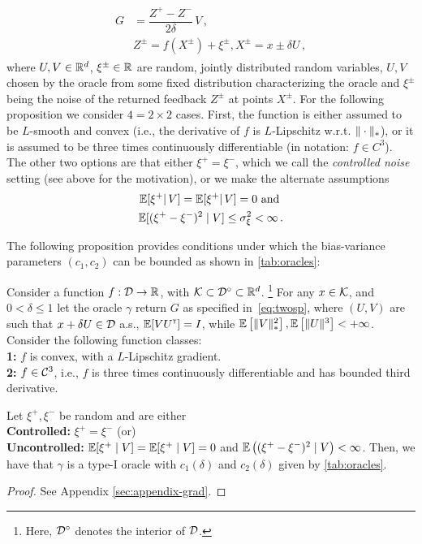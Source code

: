 \begin{align}
\begin{split}
G &=  \dfrac{Z^+ - Z^-}{2\delta}\, V \,, \\
&  Z^{\pm} = f(X^{\pm}) + \xi^{\pm}, X^{\pm} = x \pm \delta U\,,
 \end{split}
 \label{eq:twosp}
\end{align}
where $U,V\in \mathbb{R}^d$, $\xi^{\pm}\in \mathbb{R}$ are random, jointly distributed random variables, $U,V$ chosen by the oracle
from some fixed distribution characterizing the oracle and $\xi^{\pm}$ being the noise of the returned feedback $Z^{\pm}$ at points $X^{\pm}$.
For the following proposition we consider $4=2\times 2$ cases.
First, the function is either assumed to be $L$-smooth and convex (i.e., the derivative of $f$ is $L$-Lipschitz w.r.t. $\|\cdot\|_*$), or it is assumed to be three times continuously differentiable (in notation: $f\in C^3$).
The other two options are that either $\xi^+=\xi^-$, which we call the \emph{controlled noise} setting (see above for the motivation), or we make the alternate assumptions 
\begin{align}
\begin{split}
\mathbb{E}[\xi^+ |\, V] = \mathbb{E}[\xi^+ |\, V] =0 \text{ and }\\
\mathbb{E} [ (\xi^{+} - \xi^-)^{2} \mid V] \le \sigma_\xi^2 <\infty\,.
\end{split}
\label{eq:noiseass}
\end{align}

The following proposition provides conditions under which the bias-variance parameters $(c_1,c_2)$ can be bounded as shown in \cref{tab:oracles}:
\begin{proposition}
\label{prop:grad-spsa}
Consider a function $f:\mathcal{D} \to \mathbb{R}$, with $\mathcal{K} \subset \mathcal{D}^\circ \subset \mathbb{R}^d$.%
\footnote{Here, $\mathcal{D}^\circ$ denotes the interior of $\mathcal{D}$.}
For any $x \in \mathcal{K}$, and $0< \delta \le 1$ let the oracle $\gamma$ return $G$ as specified in~\eqref{eq:twosp},
where $(U,V)$ are such that $x+\delta U \in \mathcal{D}$ a.s.,
$\mathbb{E}[V U^\mathsf{\scriptscriptstyle T}] = I$, while 
$\mathbb{E}\left[\|V\|_*^2\right], \mathbb{E}\left[ \|U\|^3 \right]<+\infty$.
Consider the following function classes:\\ 
\textbf{1:} $f$ is convex, with a $L$-Lipschitz gradient.\\
\textbf{2:} $f \in \mathcal{C}^3$, i.e., $f$ is three times continuously differentiable and has bounded third derivative.

Let $\xi^+, \xi^-$ be  random and are either \\
\textbf{Controlled:} $\xi^+= \xi^-$ (or)  \\
\textbf{Uncontrolled:} $\mathbb{E}[\xi^+ \mid V] = \mathbb{E}[\xi^+ \mid V] =0$ and $\mathbb{E} \left( (\xi^{+} - \xi^-)^{2} \mid V\right) < \infty$.
\fi
Then, we have that $\gamma$ is a type-I oracle with $c_1(\delta)$ and $c_2(\delta)$ given by \cref{tab:oracles}.
\end{proposition}
\begin{proof}
See Appendix \ref{sec:appendix-grad}.
\end{proof}

